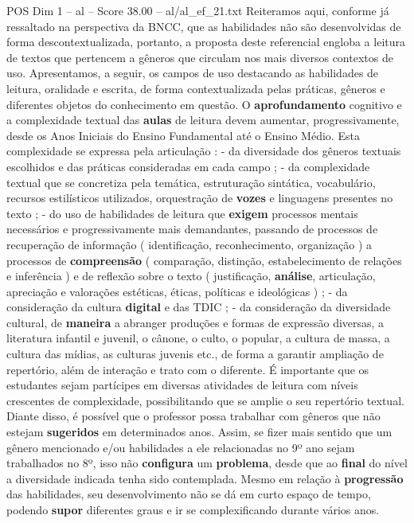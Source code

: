\begin{textsample}{POS Dim 1 – al – Score 38.00 – al/al\_ef\_21.txt}  \label{ex:f1_pos_160}
Reiteramos aqui, conforme já ressaltado na perspectiva da BNCC, que as habilidades não são desenvolvidas de forma descontextualizada, portanto, a proposta deste referencial engloba a leitura de textos que pertencem a gêneros que circulam nos mais diversos contextos de uso.
Apresentamos, a seguir, os campos de uso destacando as habilidades de leitura, oralidade e escrita, de forma contextualizada pelas práticas, gêneros e diferentes objetos do conhecimento em questão.
O \textbf{aprofundamento} cognitivo e a complexidade textual das \textbf{aulas} de leitura devem aumentar, progressivamente, desde os Anos Iniciais do Ensino Fundamental até o Ensino Médio.
Esta complexidade se expressa pela articulação : - da diversidade dos gêneros textuais escolhidos e das práticas consideradas em cada campo ; - da complexidade textual que se concretiza pela temática, estruturação sintática, vocabulário, recursos estilísticos utilizados, orquestração de \textbf{vozes} e linguagens presentes no texto ; - do uso de habilidades de leitura que \textbf{exigem} processos mentais necessários e progressivamente mais demandantes, passando de processos de recuperação de informação ( identificação, reconhecimento, organização ) a processos de \textbf{compreensão} ( comparação, distinção, estabelecimento de relações e inferência ) e de reflexão sobre o texto ( justificação, \textbf{análise}, articulação, apreciação e valorações estéticas, éticas, políticas e ideológicas ) ; - da consideração da cultura \textbf{digital} e das TDIC ; - da consideração da diversidade cultural, de \textbf{maneira} a abranger produções e formas de expressão diversas, a literatura infantil e juvenil, o cânone, o culto, o popular, a cultura de massa, a cultura das mídias, as culturas juvenis etc., de forma a garantir ampliação de repertório, além de interação e trato com o diferente.
É importante que os estudantes sejam partícipes em diversas atividades de leitura com níveis crescentes de complexidade, possibilitando que se amplie o seu repertório textual.
Diante disso, é possível que o professor possa trabalhar com gêneros que não estejam \textbf{sugeridos} em determinados anos.
Assim, se fizer mais sentido que um gênero mencionado e/ou habilidades a ele relacionadas no 9º ano sejam trabalhados no 8º, isso não \textbf{configura} um \textbf{problema}, desde que ao \textbf{final} do nível a diversidade indicada tenha sido contemplada.
Mesmo em relação à \textbf{progressão} das habilidades, seu desenvolvimento não se dá em curto espaço de tempo, podendo \textbf{supor} diferentes graus e ir se complexificando durante vários anos.

\end{textsample}

